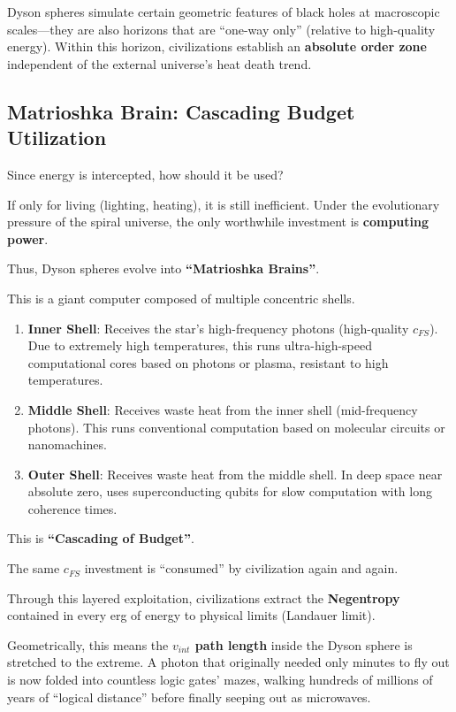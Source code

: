 Dyson spheres simulate certain geometric features of black holes at macroscopic scales---they are also horizons that are ``one-way only'' (relative to high-quality energy). Within this horizon, civilizations establish an \textbf{absolute order zone} independent of the external universe's heat death trend.

\subsection{Matrioshka Brain: Cascading Budget Utilization}

Since energy is intercepted, how should it be used?

If only for living (lighting, heating), it is still inefficient. Under the evolutionary pressure of the spiral universe, the only worthwhile investment is \textbf{computing power}.

Thus, Dyson spheres evolve into \textbf{``Matrioshka Brains''}.

This is a giant computer composed of multiple concentric shells.

\begin{enumerate}
\item \textbf{Inner Shell}: Receives the star's high-frequency photons (high-quality $c_{FS}$). Due to extremely high temperatures, this runs ultra-high-speed computational cores based on photons or plasma, resistant to high temperatures.

\item \textbf{Middle Shell}: Receives waste heat from the inner shell (mid-frequency photons). This runs conventional computation based on molecular circuits or nanomachines.

\item \textbf{Outer Shell}: Receives waste heat from the middle shell. In deep space near absolute zero, uses superconducting qubits for slow computation with long coherence times.
\end{enumerate}

This is \textbf{``Cascading of Budget''}.

The same $c_{FS}$ investment is ``consumed'' by civilization again and again.

Through this layered exploitation, civilizations extract the \textbf{Negentropy} contained in every erg of energy to physical limits (Landauer limit).

Geometrically, this means the \textbf{$v_{int}$ path length} inside the Dyson sphere is stretched to the extreme. A photon that originally needed only minutes to fly out is now folded into countless logic gates' mazes, walking hundreds of millions of years of ``logical distance'' before finally seeping out as microwaves.

